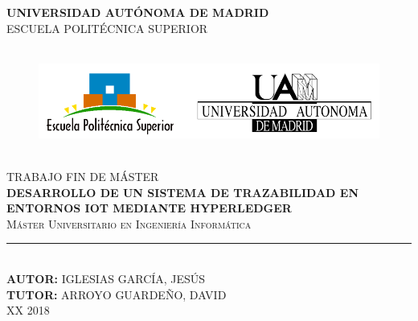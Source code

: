 \documentclass[12pt,a4paper, twoside]{report}
\newcommand{\university}{UNIVERSIDAD AUTÓNOMA DE MADRID}
\newcommand{\faculty}{ESCUELA POLITÉCNICA SUPERIOR}
\newcommand{\master}{Máster Universitario en Ingeniería Informática}
\newcommand{\tfm}{TRABAJO FIN DE MÁSTER}
\newcommand{\titleTFM}{DESARROLLO DE UN SISTEMA DE TRAZABILIDAD EN ENTORNOS IOT MEDIANTE HYPERLEDGER}
\newcommand{\jesus}{IGLESIAS GARCÍA, JESÚS}
\newcommand{\david}{ARROYO GUARDEÑO, DAVID}
\newcommand{\blankpage}{
				\newpage
				\thispagestyle{empty}
				\mbox{}
				\newpage
				}
\begin{document}
	
	\begin{titlepage}
		\begin{center}
			\vspace*{0.5in}	

			\Large{\textsc{\textbf{\university}}}\\	
			\vspace*{0.2in}
			\large{\textsc{\faculty}}\\
			\vspace*{0.5in}
			
			\begin{figure}[htb]
				\begin{center}
					\includegraphics[width=17cm, height=3.5cm]{Imagenes/eps_uam}
				\end{center}
			\end{figure}
			\vspace*{0.6in}
			\Large{\textsc{\tfm}}\\
			\vspace*{0.35in}
			\Large{\textbf{\titleTFM}} \\
			\vspace*{0.8in}
			\large{\textsc{\master}}\\
			\vspace*{0.1in}
			\rule{100mm}{0.3mm}\\ %
			\vspace*{0.5in}
			\normalsize{\textbf{AUTOR:}} \normalsize{\jesus}  \\
			\vspace*{0.1in}
			\normalsize{\textbf{TUTOR:}} \normalsize{\david} \\
			\vspace*{0.4in}
			\large{{\color{red}XX} 2018} \\
		\end{center}
	\end{titlepage}
	
	\blankpage
	
\end{document}
